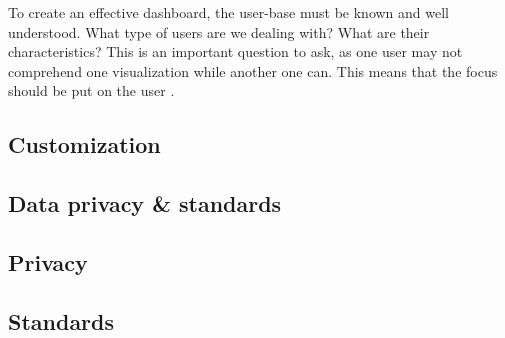     \noindent To create an effective dashboard, the user-base must be known and well understood. What type of users are we dealing with? What are their characteristics? This is an important question to ask, as one user may not comprehend one visualization while another one can. This means that the focus should be put on the user \cite{brath2004dashboard}.
        

    
    \subsection{Customization}

    \subsection{Data privacy \& standards}
        
        \subsection{Privacy} \label{2_privacy}

        \subsection{Standards} \label{2_standards}

    

        

        


